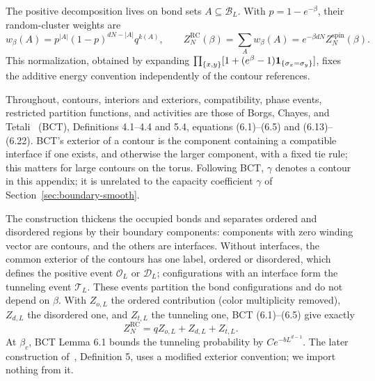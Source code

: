 The positive decomposition lives on bond sets
$A\subseteq\mathcal B_L$. With $p=1-e^{-\beta}$, their random-cluster
weights are
\begin{equation}
 w_\beta(A)=p^{|A|}(1-p)^{dN-|A|}q^{k(A)},
 \qquad
 Z_N^{\mathrm{RC}}(\beta)=\sum_Aw_\beta(A)
 =e^{-\beta dN}Z_N^{\mathrm{spin}}(\beta).
 \label{eq:sr-rc-normalization}
\end{equation}
This normalization, obtained by expanding
$\prod_{\{x,y\}}[1+(e^\beta-1)\mathbf 1_{\{\sigma_x=\sigma_y\}}]$,
fixes the additive energy convention independently of the contour
references.

Throughout, contours, interiors and exteriors,
compatibility, phase events, restricted partition functions, and activities
are those of Borgs, Chayes, and Tetali~\cite{BorgsChayesTetali2012}
(BCT), Definitions 4.1--4.4 and 5.4, equations (6.1)--(6.5) and
(6.13)--(6.22). BCT's exterior of a contour is the component
containing a compatible interface if one exists, and otherwise the
larger component, with a fixed tie rule; this matters for large
contours on the torus. Following BCT, $\gamma$ denotes a contour in
this appendix; it is unrelated to the capacity coefficient $\gamma$
of Section~\ref{sec:boundary-smooth}.

The construction thickens the occupied bonds and separates ordered and
disordered regions by their boundary components: components with zero
winding vector are contours, and the others are interfaces. Without
interfaces, the common exterior of the contours has one label, ordered
or disordered, which defines the positive event $\mathcal O_L$ or
$\mathcal D_L$; configurations with an interface form the tunneling
event $\mathcal T_L$. These events partition the bond configurations
and do not depend on $\beta$. With $Z_{o,L}$ the ordered contribution
(color multiplicity removed), $Z_{d,L}$ the disordered one, and
$Z_{t,L}$ the tunneling one, BCT (6.1)--(6.5) give exactly
\begin{equation}
 Z_N^{\mathrm{RC}}=q Z_{o,L}+Z_{d,L}+Z_{t,L}.
 \label{eq:sr-positive-contour-decomposition}
\end{equation}
At $\beta_c$, BCT Lemma 6.1 bounds the tunneling probability by
$C e^{-bL^{d-1}}$. The later construction
of~\cite{BorgsChayesHelmuthPerkinsTetali2022}, Definition 5, uses a
modified exterior convention; we import nothing from it.

